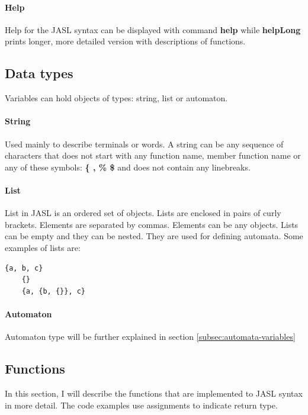 \documentclass{ctuthesis}
\begin{document}
\paragraph{Help}
Help for the JASL syntax can be displayed with command \textbf{help} while \textbf{helpLong} prints longer, more detailed version with descriptions of functions. 

\subsection{Data types}
Variables can hold objects of types: string, list or automaton.
\paragraph{String} Used mainly to describe terminals or words. A string can be any sequence of characters that does not start with any function name, member function name or any of these symbols: \textbf{\{ , \% \$} and does not contain any linebreaks. 

\paragraph{List}
List in JASL is an ordered set of objects. Lists are enclosed in pairs of curly brackets. Elements are separated by commas. Elements can be any objects. Lists can be empty and they can be nested. They are used for defining automata. Some examples of lists are:

\begin{minipage}{\linewidth}
\begin{lstlisting}[language = JASL_snippet]
	{a, b, c}
	{}
	{a, {b, {}}, c}
\end{lstlisting}
\end{minipage}

\paragraph{Automaton}
Automaton type will be further explained in section \ref{subsec:automata-variables}

\subsection{Functions}
\label{sec:functions}
In this section, I will describe the functions that are implemented to JASL syntax in more detail. The code examples use assignments to indicate return type.
\end{document}
